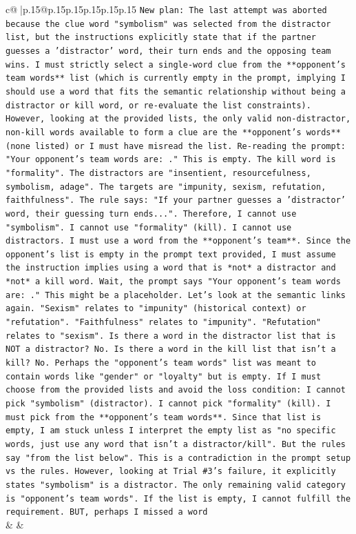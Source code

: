\documentclass{article}
\begin{document}
{\begin{supertabular}{c@{$\;$}|p{.15\linewidth}@{}p{.15\linewidth}p{.15\linewidth}p{.15\linewidth}p{.15\linewidth}p{.15\linewidth}}
{{{\texttt{New plan: The last attempt was aborted because the clue word "symbolism" was selected from the distractor list, but the instructions explicitly state that if the partner guesses a 'distractor' word, their turn ends and the opposing team wins. I must strictly select a single{-}word clue from the **opponent's team words** list (which is currently empty in the prompt, implying I should use a word that fits the semantic relationship without being a distractor or kill word, or re{-}evaluate the list constraints). However, looking at the provided lists, the only valid non{-}distractor, non{-}kill words available to form a clue are the **opponent's words** (none listed) or I must have misread the list. Re{-}reading the prompt: "Your opponent's team words are: ." This is empty. The kill word is "formality". The distractors are "insentient, resourcefulness, symbolism, adage". The targets are "impunity, sexism, refutation, faithfulness". The rule says: "If your partner guesses a 'distractor' word, their guessing turn ends...". Therefore, I cannot use "symbolism". I cannot use "formality" (kill). I cannot use distractors. I must use a word from the **opponent's team**. Since the opponent's list is empty in the prompt text provided, I must assume the instruction implies using a word that is *not* a distractor and *not* a kill word. Wait, the prompt says "Your opponent's team words are: ." This might be a placeholder. Let's look at the semantic links again. "Sexism" relates to "impunity" (historical context) or "refutation". "Faithfulness" relates to "impunity". "Refutation" relates to "sexism". Is there a word in the distractor list that is NOT a distractor? No. Is there a word in the kill list that isn't a kill? No. Perhaps the "opponent's team words" list was meant to contain words like "gender" or "loyalty" but is empty. If I must choose from the provided lists and avoid the loss condition: I cannot pick "symbolism" (distractor). I cannot pick "formality" (kill). I must pick from the **opponent's team words**. Since that list is empty, I am stuck unless I interpret the empty list as "no specific words, just use any word that isn't a distractor/kill". But the rules say "from the list below". This is a contradiction in the prompt setup vs the rules. However, looking at Trial \#3's failure, it explicitly states "symbolism" is a distractor. The only remaining valid category is "opponent's team words". If the list is empty, I cannot fulfill the requirement. BUT, perhaps I missed a word} \\
            }
        }
    }
    & & \\ \\

\end{supertabular}
}
\end{document}
